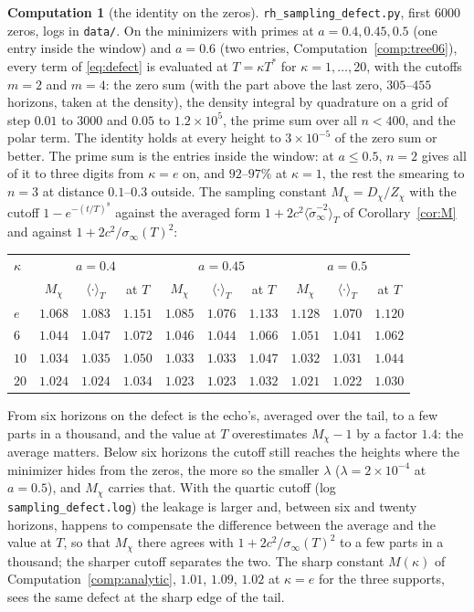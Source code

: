 \documentclass[11pt]{article}
\theoremstyle{definition}
\newtheorem{computation}[theorem]{Computation}
\theoremstyle{remark}
\newcommand{\Tst}{T^{*}}
\begin{document}
\begin{computation}[the identity on the zeros]\label{comp:defect}
\texttt{rh\_sampling\_defect.py}, first $6000$ zeros, logs in \texttt{data/}. On the minimizers with primes at $a=0.4,0.45,0.5$ (one entry inside the window) and $a=0.6$ (two entries, Computation~\ref{comp:tree06}), every term of \eqref{eq:defect} is evaluated at $T=\kappa\Tst$ for $\kappa=1,\dots,20$, with the cutoffs $m=2$ and $m=4$: the zero sum (with the part above the last zero, $305$--$455$ horizons, taken at the density), the density integral by quadrature on a grid of step $0.01$ to $3000$ and $0.05$ to $1.2\times10^5$, the prime sum over all $n<400$, and the polar term. The identity holds at every height to $3\times10^{-5}$ of the zero sum or better. The prime sum is the entries inside the window: at $a\le0.5$, $n=2$ gives all of it to three digits from $\kappa=e$ on, and $92$--$97\%$ at $\kappa=1$, the rest the smearing to $n=3$ at distance $0.1$--$0.3$ outside. The sampling constant $M_\chi=D_\chi/Z_\chi$ with the cutoff $1-e^{-(t/T)^8}$ against the averaged form $1+2c^2\langle\tilde\sigma_\infty^{-2}\rangle_T$ of Corollary~\ref{cor:M} and against $1+2c^2/\sigma_\infty(T)^2$:
\begin{center}\small
\begin{tabular}{lccccccccc}
\toprule
$\kappa$ & \multicolumn{3}{c}{$a=0.4$} & \multicolumn{3}{c}{$a=0.45$} & \multicolumn{3}{c}{$a=0.5$}\\
 & $M_\chi$ & $\langle\cdot\rangle_T$ & at $T$ & $M_\chi$ & $\langle\cdot\rangle_T$ & at $T$ & $M_\chi$ & $\langle\cdot\rangle_T$ & at $T$\\
\midrule
$e$ & $1.068$ & $1.083$ & $1.151$ & $1.085$ & $1.076$ & $1.133$ & $1.128$ & $1.070$ & $1.120$\\
$6$ & $1.044$ & $1.047$ & $1.072$ & $1.046$ & $1.044$ & $1.066$ & $1.051$ & $1.041$ & $1.062$\\
$10$ & $1.034$ & $1.035$ & $1.050$ & $1.033$ & $1.033$ & $1.047$ & $1.032$ & $1.031$ & $1.044$\\
$20$ & $1.024$ & $1.024$ & $1.034$ & $1.023$ & $1.023$ & $1.032$ & $1.021$ & $1.022$ & $1.030$\\
\bottomrule
\end{tabular}
\end{center}
From six horizons on the defect is the echo's, averaged over the tail, to a few parts in a thousand, and the value at $T$ overestimates $M_\chi-1$ by a factor $1.4$: the average matters. Below six horizons the cutoff still reaches the heights where the minimizer hides from the zeros, the more so the smaller $\lambda$ ($\lambda=2\times10^{-4}$ at $a=0.5$), and $M_\chi$ carries that. With the quartic cutoff (log \texttt{sampling\_defect.log}) the leakage is larger and, between six and twenty horizons, happens to compensate the difference between the average and the value at $T$, so that $M_\chi$ there agrees with $1+2c^2/\sigma_\infty(T)^2$ to a few parts in a thousand; the sharper cutoff separates the two. The sharp constant $M(\kappa)$ of Computation~\ref{comp:analytic}, $1.01$, $1.09$, $1.02$ at $\kappa=e$ for the three supports, sees the same defect at the sharp edge of the tail.
\end{computation}
\end{document}
